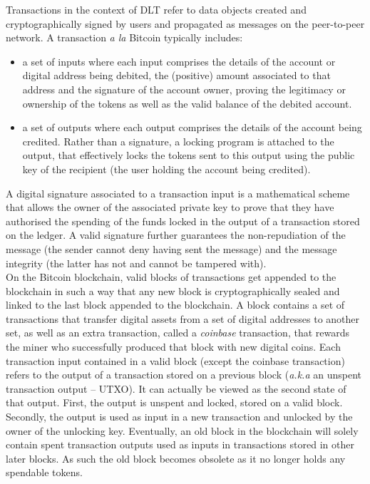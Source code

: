 Transactions in the context of DLT refer to data objects created and cryptographically signed by users and propagated as messages on the peer-to-peer network. A transaction \textit{a la} Bitcoin typically includes:

\begin{itemize}
\item a set of inputs where each input comprises the details of the account or digital address being debited, the (positive) amount associated to that address and the signature of the account owner, proving the legitimacy or ownership of the tokens as well as the valid balance of the debited account. 
\item a set of outputs where each output comprises the details of the account being credited. Rather than a signature, a locking program is attached to the output, that effectively locks the tokens sent to this output using the public key of the recipient (the user holding the account being credited).
\end{itemize}

A digital signature associated to a transaction input is a mathematical scheme that allows the owner of the associated private key to prove that they have authorised the spending of the funds locked in the output of a transaction stored on the ledger. A valid signature further guarantees the non-repudiation of the message (the sender cannot deny having sent the message) and the message integrity (the latter has not and cannot be tampered with). \\

On the Bitcoin blockchain, valid blocks of transactions get appended to the blockchain in such a way that any new block is cryptographically sealed and linked to the last block appended to the blockchain. A block contains a set of transactions that transfer digital assets from a set of digital addresses to another set, as well as an extra transaction, called a \textit{coinbase} transaction, that rewards the miner who successfully produced that block with new digital coins. Each transaction input contained in a valid block (except the coinbase transaction) refers to the output of a transaction stored on a previous block (\textit{a.k.a} an unspent transaction output – UTXO).  It can actually be viewed as the second state of that output. First, the output is unspent and locked, stored on a valid block. Secondly, the output is used as input in a new transaction and unlocked by the owner of the unlocking key. Eventually, an old block in the blockchain will solely contain spent transaction outputs used as inputs in transactions stored in other later blocks. As such the old block becomes obsolete as it no longer holds any spendable tokens. \\

